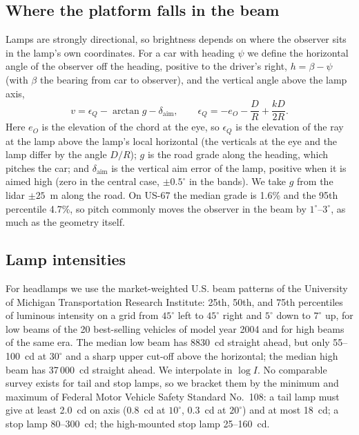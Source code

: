 \documentclass[aip,jap,amsmath,amssymb,reprint,floatfix]{revtex4-2}
\begin{document}
\subsection{Where the platform falls in the beam}

Lamps are strongly directional, so brightness depends on where the observer sits in the lamp's own coordinates. For a car with heading $\psi$ we define the horizontal angle of the observer off the heading, positive to the driver's right, $h=\beta-\psi$ (with $\beta$ the bearing from car to observer), and the vertical angle above the lamp axis,
\begin{equation}
v = \epsilon_Q - \arctan g - \delta_{\mathrm{aim}},\qquad
\epsilon_Q = -e_O - \frac{D}{R} + \frac{kD}{2R}.
\label{eq:angles}
\end{equation}
Here $e_O$ is the elevation of the chord at the eye, so $\epsilon_Q$ is the elevation of the ray at the lamp above the lamp's local horizontal (the verticals at the eye and the lamp differ by the angle $D/R$); $g$ is the road grade along the heading, which pitches the car; and $\delta_{\mathrm{aim}}$ is the vertical aim error of the lamp, positive when it is aimed high (zero in the central case, $\pm0.5^\circ$ in the bands). We take $g$ from the lidar $\pm25$~m along the road. On US-67 the median grade is 1.6\% and the 95th percentile 4.7\%, so pitch commonly moves the observer in the beam by $1^\circ$--$3^\circ$, as much as the geometry itself.

\subsection{Lamp intensities}

For headlamps we use the market-weighted U.S. beam patterns of the University of Michigan Transportation Research Institute: 25th, 50th, and 75th percentiles of luminous intensity on a grid from $45^\circ$ left to $45^\circ$ right and $5^\circ$ down to $7^\circ$ up, for low beams of the 20 best-selling vehicles of model year 2004 and for high beams of the same era.\cite{Schoettle2004,Schoettle2001} The median low beam has 8830~cd straight ahead, but only 55--100~cd at $30^\circ$ and a sharp upper cut-off above the horizontal; the median high beam has 37\,000~cd straight ahead. We interpolate in $\log I$. No comparable survey exists for tail and stop lamps, so we bracket them by the minimum and maximum of Federal Motor Vehicle Safety Standard No.~108: a tail lamp must give at least 2.0~cd on axis (0.8~cd at $10^\circ$, 0.3~cd at $20^\circ$) and at most 18~cd; a stop lamp 80--300~cd; the high-mounted stop lamp 25--160~cd.\cite{TP108}
\end{document}
